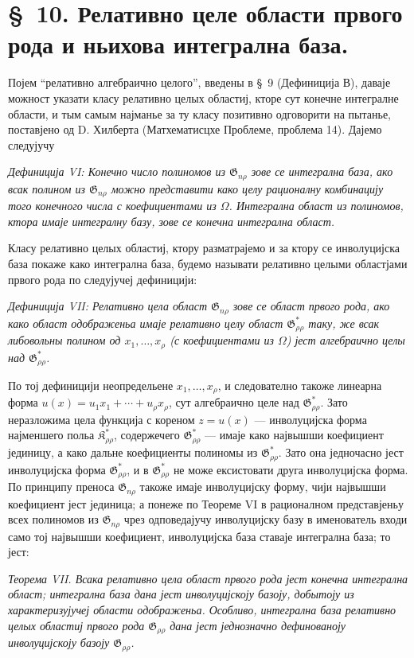 ﻿\documentclass[11pt]{article}
\providecommand{\Kfield}{\mathfrak{K}}
\providecommand{\Gdom}{\mathfrak{G}}
\begin{document}
\section*{\S\ 10. Релативно целе области првого рода и ньихова интегрална база.}

Појем ``релативно алгебраично целого'', введены в \S\ 9 (Дефиниција В), даваје можност указати класу релативно целых областиј, кторе сут конечне интегралне области, и тым самым најманье за ту класу позитивно одговорити на пытанье, поставјено од D. Хилберта (Матхематисцхе Проблеме, проблема 14). Дајемо следујучу

{\itshape Дефиниција VI: Конечно число полиномов из $\Gdom_{n\rho}$ зове се интегрална база, ако всак полином из $\Gdom_{n\rho}$ можно представити како целу рационалну комбинацију того конечного числа с коефициентами из $\Omega$. Интегрална област из полиномов, ктора имаје интегралну базу, зове се конечна интегрална област.}

Класу релативно целых областиј, ктору разматрајемо и за ктору се инволуцијска база покаже како интегрална база, будемо называти релативно целыми областјами првого рода по следујучеј дефиницији:

{\itshape Дефиниција VII: Релативно цела област $\Gdom_{n\rho}$ зове се област првого рода, ако како област одображеньа имаје релативно целу област $\Gdom^*_{\rho\rho}$ таку, же всак либовольны полином од $x_1,\ldots,x_\rho$ (с коефициентами из $\Omega$) јест алгебраично целы над $\Gdom^*_{\rho\rho}$.}

По тој дефиницији неопредельене $x_1,\ldots,x_\rho$, и следователно такоже линеарна форма $u(x)=u_1x_1+\cdots+u_\rho x_\rho$, сут алгебраично целе над $\Gdom^*_{\rho\rho}$. Зато неразложима цела функција с кореном $z=u(x)$ --- инволуцијска форма најменшего польа $\Kfield^*_{\rho\rho}$, содержечего $\Gdom^*_{\rho\rho}$ --- имаје како највышши коефициент јединицу, а како дальне коефициенты полиномы из $\Gdom^*_{\rho\rho}$. Зато она једночасно јест инволуцијска форма $\Gdom^*_{\rho\rho}$, и в $\Gdom^*_{\rho\rho}$ не може ексистовати друга инволуцијска форма. По принципу преноса $\Gdom_{n\rho}$ такоже имаје инволуцијску форму, чији највышши коефициент јест јединица; а понеже по Теореме VI в рационалном представјеньу всех полиномов из $\Gdom_{n\rho}$ чрез одповедајучу инволуцијску базу в именователь входи само тој највышши коефициент, инволуцијска база ставаје интегрална база; то јест:

{\itshape Теорема VII. Всака релативно цела област првого рода јест конечна интегрална област; интегрална база дана јест инволуцијскоју базоју, добытоју из характеризујучеј области одображеньа. Особливо, интегрална база релативно целых областиј првого рода $\Gdom_{\rho\rho}$ дана јест једнозначно дефинованоју инволуцијскоју базоју $\Gdom_{\rho\rho}$.}
\end{document}
